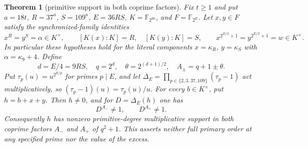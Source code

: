 \documentclass[11pt]{article}
\newtheorem{theorem}{Theorem}[section]
\theoremstyle{definition}
\theoremstyle{remark}
\begin{document}
\begin{theorem}[primitive support in both coprime factors]
\label{thm:equal-norm-two-factors}
Fix $t\geq1$ and put $a=18t$, $R=37^a$, $S=109^a$, $E=36RS$,
$K=\mathbb F_{2^{36}}$, and $F=\mathbb F_{2^E}$. Let $x,y\in F$ satisfy the
synchronized-family identities
\[
 x^R=y^S=\alpha\in K^\times,\qquad
 [K(x):K]=R,\quad [K(y):K]=S,\qquad
 x^{2^{E/2}+1}=y^{2^{E/2}+1}=w\in K^\times.
\]
In particular these hypotheses hold for the literal components
$x=\kappa_R$, $y=\kappa_S$ with $\alpha=\kappa_9+4$.
Define
\[
 d=E/4=9RS,\quad q=2^d,\quad \theta=2^{(d+1)/2},\quad
 A_\pm=q+1\pm\theta.
\]
Put $\tau_p(u)=u^{2^{E/p}}$ for primes $p\mid E$, and let $\Delta_E=\prod_{p\in\{2,3,37,109\}}(\tau_p-1)$ act
multiplicatively, so $(\tau_p-1)(u)=\tau_p(u)/u$.
For every $b\in K^\times$, put $h=b+x+y$. Then $h\ne0$, and for
$D=\Delta_E(h)$ one has
\[
                    D^{A_-}\ne1,\qquad D^{A_+}\ne1.
\]
Consequently $h$ has nonzero primitive-degree multiplicative support in
both coprime factors $A_-$ and $A_+$ of $q^2+1$. This asserts neither full
primary order at any specified prime nor the value of the excess.
\end{theorem}
\end{document}

